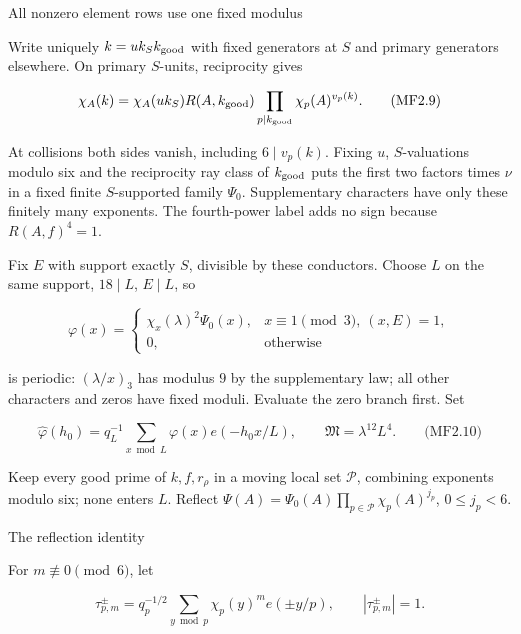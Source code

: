 All nonzero element rows use one fixed modulus

Write uniquely \(k=uk_Sk_{\rm good}\) with fixed generators at \(S\) and primary generators elsewhere. On primary \(S\)-units, reciprocity gives

\hypertarget{mf:eq:B2.9}{}

\label{mf:eq:B2.9}

\[
\chi_A(k)=\chi_A(uk_S)R(A,k_{\rm good})
          \prod_{p\mid k_{\rm good}}\chi_p(A)^{v_p(k)}.
\qquad\text{(MF2.9)}
\]

At collisions both sides vanish, including \(6\mid v_p(k)\). Fixing \(u\), \(S\)-valuations modulo six and the reciprocity ray class of \(k_{\rm good}\) puts the first two factors times \(\nu\) in a fixed finite \(S\)-supported family \(\Psi_0\). Supplementary characters have only these finitely many exponents. The fourth-power label adds no sign because \(R(A,f)^4=1\).

Fix \(E\) with support exactly \(S\), divisible by these conductors. Choose \(L\) on the same support, \(18\mid L\), \(E\mid L\), so

\[
\varphi(x)=
\begin{cases}
\chi_x(\lambda)^2\Psi_0(x),&x\equiv1\pmod3,\ (x,E)=1,\\
0,&\text{otherwise}
\end{cases}
\]

is periodic: \((\lambda/x)_3\) has modulus \(9\) by the supplementary law; all other characters and zeros have fixed moduli. Evaluate the zero branch first. Set

\hypertarget{mf:eq:B2.10}{}

\label{mf:eq:B2.10}

\[
\widehat\varphi(h_0)=q_L^{-1}\sum_{x\bmod L}\varphi(x)e(-h_0x/L),
\qquad \mathfrak M=\lambda^{12}L^4.
\qquad\text{(MF2.10)}
\]

Keep every good prime of \(k,f,r_\rho\) in a moving local set \(\mathcal P\), combining exponents modulo six; none enters \(L\). Reflect \(\Psi(A)=\Psi_0(A)\prod_{p\in\mathcal P}\chi_p(A)^{j_p}\), \(0\le j_p<6\).

\hypertarget{the-reflection-identity}{}

\label{the-reflection-identity}

The reflection identity

For \(m\not\equiv0\pmod6\), let

\[
\tau_{p,m}^{\pm}=q_p^{-1/2}\sum_{y\bmod p}\chi_p(y)^m e(\pm y/p),
\qquad |\tau_{p,m}^{\pm}|=1.
\]

